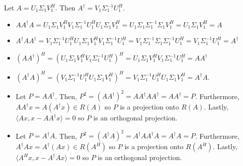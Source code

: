 \documentclass[12pt]{article}
\newenvironment{problem}[2][Problem]{\begin{trivlist}
\item[\hskip \labelsep {\bfseries #1}\hskip \labelsep {\bfseries #2}]}{\end{trivlist}}
\begin{document}
\begin{problem}{38.} Let $A = U_1\Sigma_1V_1^H$. Then $A^{\dagger} = V_1\Sigma_1^{-1}U^H_1$. 
\begin{itemize}
\item [(i)] $AA^{\dagger}A = U_1\Sigma_1V_1^{H}V_1\Sigma_1^{-1}U^H_1U_1\Sigma_1V_1^{H} = U_1\Sigma_1\Sigma_1^{-1}\Sigma_1V_1^{H}  = U_1\Sigma_1V_1^{H} = A$
\item [(ii)] $A^{\dagger}AA^{\dagger} = V_1\Sigma_1^{-1}U^H_1U_1\Sigma_1V_1^{H}V_1\Sigma_1^{-1}U^H_1 = 
V_1\Sigma_1^{-1}\Sigma_1\Sigma_1^{-1}U^H_1 = V_1\Sigma_1^{-1}U^H_1 = A^{\dagger}$
\item [(iii)] $(AA^{\dagger})^H = (U_1\Sigma_1V_1^HV_1\Sigma_1^{-1}U^H_1)^{H} = U_1\Sigma_1V_1^HV_1\Sigma_1^{-1}U^H_1 = AA^{\dagger}$
\item [(iv)] $(A^{\dagger}A)^H = (V_1\Sigma_1^{-1}U^H_1U_1\Sigma_1V_1^H)^H = V_1\Sigma_1^{-1}U^H_1U_1\Sigma_1V_1^H = A^{\dagger}A$. 
\item [(v)] Let $P =AA^{\dagger}$. Then, $P^2 = (AA^{\dagger})^2 = AA^{\dagger}AA^{\dagger} = AA^{\dagger} = P$. Furthermore, $AA^{\dagger}x = A(A^{\dagger}x) \in R(A)$ so $P$ is a projection onto $R(A)$. Lastly, $\langle Ax, x- AA^{\dagger}x\rangle = 0$ so $P$ is an orthogonal projection. 
\item [(vi)] Let $P =A^{\dagger}A$. Then, $P^2 = (A^{\dagger}A)^2 = A^{\dagger}AA^{\dagger}A = A^{\dagger}A = P$. Furthermore, $A^{\dagger}Ax = A^{\dagger}(Ax) \in R(A^H)$ so $P$ is a projection onto $R(A^H)$. Lastly, $\langle A^Hx, x- A^{\dagger}Ax\rangle  = 0$ so $P$ is an orthogonal projection. 
\end{itemize}
\end{problem}
\end{document}
